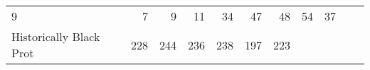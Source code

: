 \documentclass[]{article}
\begin{document}
\begin{longtable}[]{@{}lrrrrrrrrrr@{}}
\begin{minipage}[t]{0.05\columnwidth}
9\strut
\end{minipage} & \begin{minipage}[t]{0.05\columnwidth}\raggedleft\strut
7\strut
\end{minipage} & \begin{minipage}[t]{0.05\columnwidth}\raggedleft\strut
9\strut
\end{minipage} & \begin{minipage}[t]{0.05\columnwidth}\raggedleft\strut
11\strut
\end{minipage} & \begin{minipage}[t]{0.05\columnwidth}\raggedleft\strut
34\strut
\end{minipage} & \begin{minipage}[t]{0.06\columnwidth}\raggedleft\strut
47\strut
\end{minipage} & \begin{minipage}[t]{0.06\columnwidth}\raggedleft\strut
48\strut
\end{minipage} & \begin{minipage}[t]{0.04\columnwidth}\raggedleft\strut
54\strut
\end{minipage} & \begin{minipage}[t]{0.11\columnwidth}\raggedleft\strut
37\strut
\end{minipage}\tabularnewline
\begin{minipage}[t]{0.14\columnwidth}\raggedright\strut
Historically Black Prot\strut
\end{minipage} & \begin{minipage}[t]{0.04\columnwidth}\raggedleft\strut
228\strut
\end{minipage} & \begin{minipage}[t]{0.05\columnwidth}\raggedleft\strut
244\strut
\end{minipage} & \begin{minipage}[t]{0.05\columnwidth}\raggedleft\strut
236\strut
\end{minipage} & \begin{minipage}[t]{0.05\columnwidth}\raggedleft\strut
238\strut
\end{minipage} & \begin{minipage}[t]{0.05\columnwidth}\raggedleft\strut
197\strut
\end{minipage} & \begin{minipage}[t]{0.05\columnwidth}\raggedleft\strut
223\strut
\end{minipage} & \begin{minipage}[t]{0.06\columnwidth}\raggedleft\strut

\end{minipage}
\end{longtable}
\end{document}
